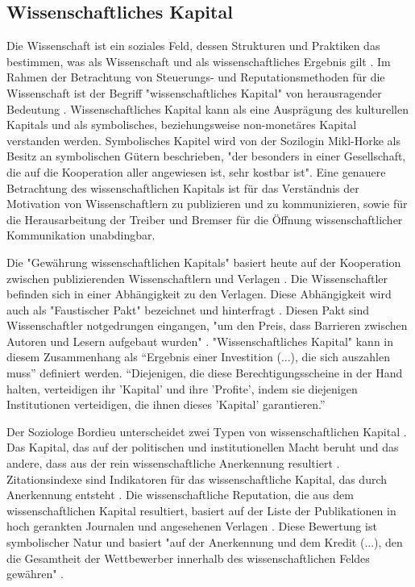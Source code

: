 \subsection{Wissenschaftliches Kapital}

Die Wissenschaft ist ein soziales Feld, dessen Strukturen und Praktiken das bestimmen, was als Wissenschaft und als wissenschaftliches Ergebnis gilt \cite{mikl_2010_soziologie}. Im Rahmen der Betrachtung von Steuerungs- und Reputationsmethoden für die Wissenschaft ist der Begriff "wissenschaftliches Kapital" von herausragender Bedeutung \cite{suchen}. Wissenschaftliches Kapital kann als eine Ausprägung des kulturellen Kapitals und als symbolisches, beziehungsweise non-monetäres Kapital \cite{irmer2011} \cite{hagner_2015_sache_buches} verstanden werden. Symbolisches Kapitel wird von der Sozilogin Mikl-Horke als Besitz an symbolischen Gütern beschrieben, "der besonders in einer Gesellschaft, die auf die Kooperation aller angewiesen ist, sehr kostbar ist"\cite{mikl_2010_soziologie}. Eine genauere Betrachtung des wissenschaftlichen Kapitals ist für das Verständnis der Motivation von Wissenschaftlern zu publizieren und zu kommunizieren, sowie für die Herausarbeitung der Treiber und Bremser für die Öffnung wissenschaftlicher Kommunikation unabdingbar.

Die "Gewährung wissenschaftlichen Kapitals" basiert heute auf der Kooperation zwischen publizierenden Wissenschaftlern und Verlagen \cite{herb_2006}. Die Wissenschaftler befinden sich in einer Abhängigkeit zu den Verlagen. Diese Abhängigkeit wird auch als "Faustischer Pakt" bezeichnet und hinterfragt \cite{hagner_2015_sache_buches} \cite{Parks_2002_acadamic_faust}. Diesen Pakt sind Wissenschaftler notgedrungen eingangen, "um den Preis, dass Barrieren zwischen Autoren und Lesern aufgebaut wurden" \cite{hagner_2015_sache_buches}. "Wissenschaftliches Kapital" kann in diesem Zusammenhang als “Ergebnis einer Investition (...), die sich auszahlen muss” \cite{herb_2006} definiert werden. “Diejenigen, die diese Berechtigungsscheine in der Hand halten, verteidigen ihr 'Kapital' und ihre 'Profite', indem sie diejenigen Institutionen verteidigen, die ihnen dieses 'Kapital' garantieren.” \cite{Bourdieu_1992}

Der Soziologe Bordieu unterscheidet zwei Typen von wissenschaftlichen Kapital \cite{Bourdieu_1998}. Das Kapital, das auf der politischen und institutionellen Macht beruht und das andere, dass aus der rein wissenschaftliche Anerkennung resultiert \cite{mikl_2010_soziologie}. Zitationsindexe sind Indikatoren für das wissenschaftliche Kapital, das durch Anerkennung entsteht \cite{Bourdieu_1998}. Die wissenschaftliche Reputation, die aus dem wissenschaftlichen Kapital resultiert, basiert auf der Liste der Publikationen in hoch gerankten Journalen und angesehenen Verlagen \cite{herb_2010}. Diese Bewertung ist symbolischer Natur und basiert "auf der Anerkennung und dem Kredit (...), den die Gesamtheit der Wettbewerber innerhalb des wissenschaftlichen Feldes gewähren" \cite{Bourdieu_1998} \cite{herb_2010}.


